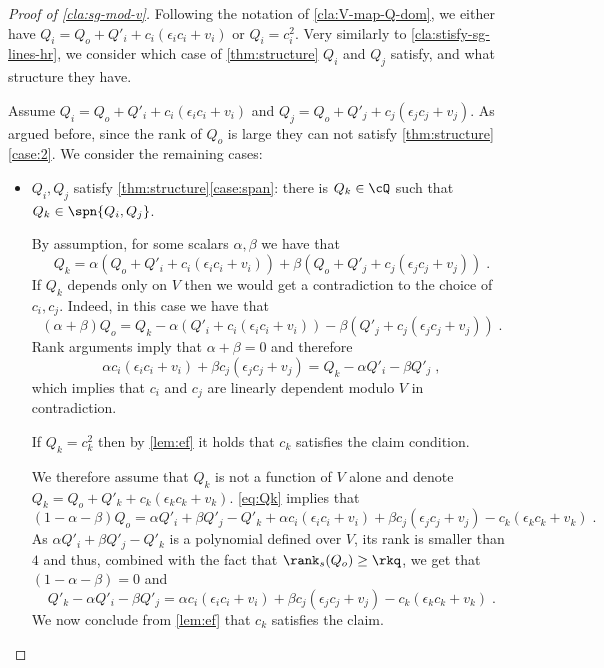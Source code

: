 \begin{proof}[Proof of \autoref{cla:sg-mod-v}] 

Following the notation of \autoref{cla:V-map-Q-dom}, we either have $Q_i = Q_o + Q'_i +  c_i(\epsilon_i c_i + v_i )$ or   $Q_i = c_i^2$. Very similarly to \autoref{cla:stisfy-sg-lines-hr}, we  consider which case of \autoref{thm:structure}  $Q_i$ and $Q_j$  satisfy, and what structure they have.

Assume  $Q_i = Q_o + Q'_i +  c_i(\epsilon_i c_i + v_i )$ and  $Q_j = Q_o + Q'_j +  c_j(\epsilon_jc_j + v_j )$. As argued before, since the rank of $Q_o$ is large  they can not satisfy
 \autoref{thm:structure}\ref{case:2}. We consider the remaining cases:
\begin{itemize}
\item $Q_i,Q_j$ satisfy \autoref{thm:structure}\ref{case:span}: there is $Q_k \in \cQ$ such that $Q_k \in \spn{Q_i,Q_j}$. 

By assumption, for some scalars $\alpha,\beta$ we have that 
\begin{equation}\label{eq:Qk}
Q_k  = \alpha(Q_o + Q'_i +  c_i(\epsilon_i c_i + v_i )) + \beta(Q_o + Q'_j +  c_j(\epsilon_j c_j + v_j)) \;.  
\end{equation}
If $Q_k$ depends only on $V$ then we would get a contradiction to the choice of $c_i,c_j$. Indeed, in this case we have that
$$(\alpha+\beta)Q_o = Q_k - \alpha( Q'_i +  c_i(\epsilon_i c_i + v_i )) - \beta( Q'_j +  c_j(\epsilon_j c_j + v_j))\;.$$
Rank arguments imply that $\alpha+\beta=0$ and therefore 
$$\alpha c_i(\epsilon_i c_i + v_i ) + \beta c_j(\epsilon_j c_j + v_j) = Q_k - \alpha Q'_i - \beta Q'_j \;,$$
which implies that $c_i$ and $c_j$ are linearly dependent modulo $V$ in contradiction. 

If $Q_k = c_k^2$ then by \autoref{lem:ef} it holds that $c_k$ satisfies the claim condition.

We therefore assume that $Q_k$ is not a function of $V$ alone and denote $Q_k = Q_o + Q'_k +  c_k(\epsilon_k c_k + v_k)$.
\autoref{eq:Qk} implies that $$(1 - \alpha-\beta)Q_o = \alpha Q'_i + \beta Q'_j - Q'_k + \alpha c_i(\epsilon_i c_i + v_i ) + \beta c_j(\epsilon_j c_j + v_j) - c_k(\epsilon_k c_k + v_k)\;.$$ As $\alpha Q'_i + \beta Q'_j - Q'_k$ is a polynomial defined over $V$, its rank is smaller than $4$ and thus, combined with the fact that $\rank_s(Q_o) \geq \rkq$, we get that $ (1 - \alpha-\beta) = 0$ and 
\[Q'_k -\alpha Q'_i - \beta Q'_j = \alpha c_i(\epsilon_i c_i + v_i ) + \beta c_j(\epsilon_j c_j + v_j) - c_k(\epsilon_k c_k + v_k) \;.\]
We now conclude from \autoref{lem:ef} that $c_k$ satisfies the claim. 


\end{itemize}
\end{proof}
